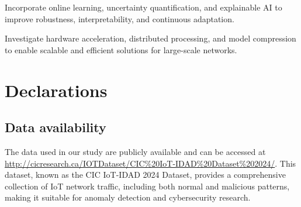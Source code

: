 \documentclass[pdflatex,sn-mathphys-num]{sn-jnl}
\theoremstyle{thmstyleone}
\theoremstyle{thmstyletwo}
\theoremstyle{thmstylethree}
\begin{document}
\noindent Incorporate online learning, uncertainty quantification, and explainable AI to improve robustness, interpretability, and continuous adaptation.
    
\noindent Investigate hardware acceleration, distributed processing, and model compression to enable scalable and efficient solutions for large-scale networks.

\backmatter


\section*{Declarations}

\subsection*{Data availability}
The data used in our study are publicly available and can be accessed at \url{http://cicresearch.ca/IOTDataset/CIC%20IoT-IDAD%20Dataset%202024/}. This dataset, known as the CIC IoT-IDAD 2024 Dataset, provides a comprehensive collection of IoT network traffic, including both normal and malicious patterns, making it suitable for anomaly detection and cybersecurity research.



\end{document}
